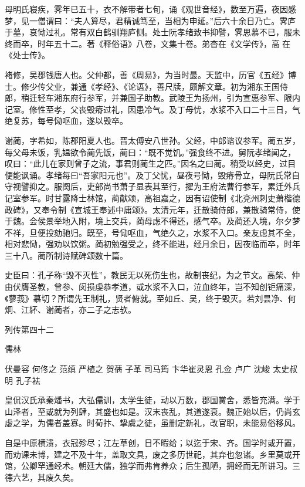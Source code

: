 \documentclass[12pt,UTF8]{ctexbook}
\begin{document}
母明氏寝疾，霁年已五十，衣不解带者七旬，诵《观世音经》，数至万遍，夜因感梦，见一僧谓曰：“夫人算尽，君精诚笃至，当相为申延。”后六十余日乃亡。霁庐于墓，哀恸过礼。常有双白鹤驯翔庐侧。处士阮孝绪致书抑譬，霁思慕不已，服未终而卒，时年五十二。著《释俗语》八卷，文集十卷。弟杳在《文学传》，高在《处士传》。

褚修，吴郡钱唐人也。父仲都，善《周易》，为当时最。天监中，历官《五经》博士。修少传父业，兼通《孝经》、《论语》，善尺牍，颇解文章。初为湘东王国侍郎，稍迁轻车湘东府行参军，并兼国子助教。武陵王为扬州，引为宣惠参军、限内记室。修性至孝，父丧毁瘠过礼，因患冷气。及丁母忧，水浆不入口二十三日，气绝复苏，每号恸呕血，遂以毁卒。

谢蔺，字希如，陈郡阳夏人也。晋太傅安八世孙。父经，中郎谘议参军。蔺五岁，每父母未饭，乳媪欲令蔺先饭，蔺曰：“既不觉饥。”强食终不进。舅阮孝绪闻之，叹曰：“此儿在家则曾子之流，事君则蔺生之匹。”因名之曰蔺。稍受以经史，过目便能讽诵。孝绪每曰“吾家阳元也”。及丁父忧，昼夜号恸，毁瘠骨立，母阮氏常自守视譬抑之。服阕后，吏部尚书萧子显表其至行，擢为王府法曹行参军，累迁外兵记室参军。时甘露降士林馆，蔺献颂，高祖嘉之，因有诏使制《北兗州刺史萧楷德政碑》，又奉令制《宣城王奉述中庸颂》。太清元年，迁散骑侍郎，兼散骑常侍，使于魏。会侯景举地入附，境上交兵，蔺母虑不得还，感气卒。及蔺还入境，尔夕梦不祥，旦便投劾驰归。既至，号恸呕血，气绝久之，水浆不入口。亲友虑其不全，相对悲恸，强劝以饮粥。蔺初勉强受之，终不能进，经月余日，因夜临而卒，时年三十八。蔺所制诗赋碑颂数十篇。

史臣曰：孔子称“毁不灭性”，教民无以死伤生也，故制丧纪，为之节文。高柴、仲由伏膺圣教，曾参、闵损虔恭孝道，或水浆不入口，泣血终年，岂不知创钜痛深，《蓼莪》慕切？所谓先王制礼，贤者俯就。至如丘、吴，终于毁灭。若刘昙净、何炯、江紑、谢蔺者，亦二子之志欤。





列传第四十二

儒林

伏曼容 何佟之 范缜 严植之 贺蒨 子革 司马筠 卞华崔灵恩 孔佥 卢广 沈峻 太史叔明 孔子袪

皇侃汉氏承秦燔书，大弘儒训，太学生徒，动以万数，郡国黉舍，悉皆充满。学于山泽者，至或就为列肆，其盛也如是。汉末丧乱，其道遂衰。魏正始以后，仍尚玄虚之学，为儒者盖寡。时荀抃、挚虞之徒，虽删定新礼，改官职，未能易俗移风。

自是中原横溃，衣冠殄尽；江左草创，日不暇给；以迄于宋、齐。国学时或开置，而劝课未博，建之不及十年，盖取文具，废之多历世祀，其弃也忽诸。乡里莫或开馆，公卿罕通经术。朝廷大儒，独学而弗肯养众；后生孤陋，拥经而无所讲习。三德六艺，其废久矣。
\end{document}
